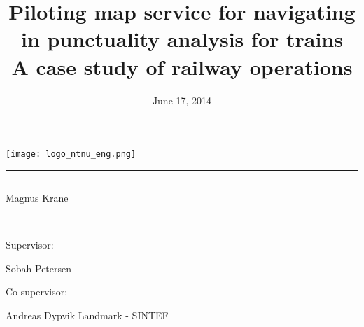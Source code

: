 \title{Piloting map service for navigating in punctuality analysis for trains \\ \vspace{2 mm} {\large A case study of railway
operations}}\date{ June 17, 2014}


\begin{titlepage}
\begin{center}

\vspace{10mm}
\texttt{[image: logo\_ntnu\_eng.png]}~\\[1cm]
 \vspace{30mm}

\makeatletter
    \parindent \z@
    \reset@font
    \p@
    \par
    \hrule height 2pt
    \par
    \p@
    \huge \@title
    \p@
    \par
    \hrule height 2pt
    \par
    \begin{flushright}
      \large \@date \par
    \end{flushright}
    \p@
 \vspace{20mm}
\begin{minipage}{0.4\textwidth}
\begin{flushleft} \large
\centerline{Magnus Krane}
~\\
\centerline{Supervisor:}
\centerline{Sobah Petersen}
\centerline{Co-supervisor:}
\centerline{Andreas Dypvik Landmark - SINTEF}
\end{flushleft}
\end{minipage}
\vfill
\end{center}
\end{titlepage}

